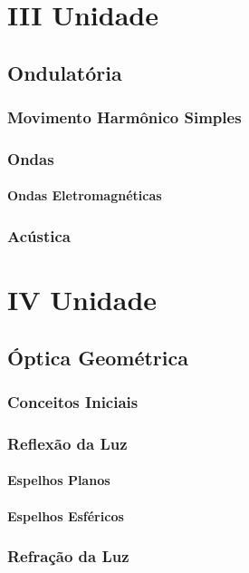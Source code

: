 \documentclass[12pt,a4paper]{book}
\begin{document}
\part*{III Unidade}

\chapter{Ondulatória}
	\section{Movimento Harmônico Simples}
	
	\section{Ondas}
		\subsection{Ondas Eletromagnéticas}
	
	\section{Acústica}
	
\part*{IV Unidade}
\chapter{Óptica Geométrica}
	\section{Conceitos Iniciais}
	\section{Reflexão da Luz}
		\subsection{Espelhos Planos}
		\subsection{Espelhos Esféricos}
	\section{Refração da Luz}
\end{document}
